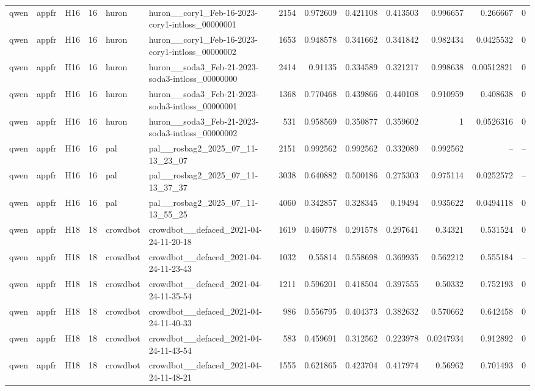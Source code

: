 \begin{longtable}{lllrllrrrrrrr}
qwen & appfr & H16 & 16 & huron & huron\_\_cory1\_Feb-16-2023-cory1-intloss\_00000001 & 2154 & 0.972609 & 0.421108 & 0.413503 & 0.996657 & 0.266667 & 0 \\
qwen & appfr & H16 & 16 & huron & huron\_\_cory1\_Feb-16-2023-cory1-intloss\_00000002 & 1653 & 0.948578 & 0.341662 & 0.341842 & 0.982434 & 0.0425532 & 0 \\
qwen & appfr & H16 & 16 & huron & huron\_\_soda3\_Feb-21-2023-soda3-intloss\_00000000 & 2414 & 0.91135 & 0.334589 & 0.321217 & 0.998638 & 0.00512821 & 0 \\
qwen & appfr & H16 & 16 & huron & huron\_\_soda3\_Feb-21-2023-soda3-intloss\_00000001 & 1368 & 0.770468 & 0.439866 & 0.440108 & 0.910959 & 0.408638 & 0 \\
qwen & appfr & H16 & 16 & huron & huron\_\_soda3\_Feb-21-2023-soda3-intloss\_00000002 & 531 & 0.958569 & 0.350877 & 0.359602 & 1 & 0.0526316 & 0 \\
qwen & appfr & H16 & 16 & pal & pal\_\_rosbag2\_2025\_07\_11-13\_23\_07 & 2151 & 0.992562 & 0.992562 & 0.332089 & 0.992562 & -- & -- \\
qwen & appfr & H16 & 16 & pal & pal\_\_rosbag2\_2025\_07\_11-13\_37\_37 & 3038 & 0.640882 & 0.500186 & 0.275303 & 0.975114 & 0.0252572 & -- \\
qwen & appfr & H16 & 16 & pal & pal\_\_rosbag2\_2025\_07\_11-13\_55\_25 & 4060 & 0.342857 & 0.328345 & 0.19494 & 0.935622 & 0.0494118 & 0 \\
qwen & appfr & H18 & 18 & crowdbot & crowdbot\_\_defaced\_2021-04-24-11-20-18 & 1619 & 0.460778 & 0.291578 & 0.297641 & 0.34321 & 0.531524 & 0 \\
qwen & appfr & H18 & 18 & crowdbot & crowdbot\_\_defaced\_2021-04-24-11-23-43 & 1032 & 0.55814 & 0.558698 & 0.369935 & 0.562212 & 0.555184 & -- \\
qwen & appfr & H18 & 18 & crowdbot & crowdbot\_\_defaced\_2021-04-24-11-35-54 & 1211 & 0.596201 & 0.418504 & 0.397555 & 0.50332 & 0.752193 & 0 \\
qwen & appfr & H18 & 18 & crowdbot & crowdbot\_\_defaced\_2021-04-24-11-40-33 & 986 & 0.556795 & 0.404373 & 0.382632 & 0.570662 & 0.642458 & 0 \\
qwen & appfr & H18 & 18 & crowdbot & crowdbot\_\_defaced\_2021-04-24-11-43-54 & 583 & 0.459691 & 0.312562 & 0.223978 & 0.0247934 & 0.912892 & 0 \\
qwen & appfr & H18 & 18 & crowdbot & crowdbot\_\_defaced\_2021-04-24-11-48-21 & 1555 & 0.621865 & 0.423704 & 0.417974 & 0.56962 & 0.701493 & 0 \\

\end{longtable}
